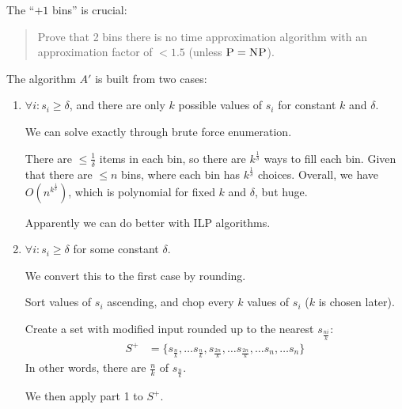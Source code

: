                 The ``$+1$ bins'' is crucial:
                \begin{quote}
                    Prove that 2 bins there is no \p time approximation algorithm with an approximation factor of $< 1.5$ (unless $\textsc{P} = \textsc{NP}$).
                \end{quote}

                The algorithm $A'$ is built from two cases:
                \begin{enumerate}
                    \item $\forall i: s_i \ge \delta$, and there are only $k$ possible values of $s_i$ for constant $k$ and $\delta$.

                        We can solve exactly through brute force enumeration.

                        There are $\le \frac{1}{\delta}$ items in each bin, so there are $k^\frac{1}{\delta}$ ways to fill each bin.
                        Given that there are $\le n$ bins, where each bin has $k^\frac{1}{\delta}$ choices.
                        Overall, we have $O(n^{k^\frac{1}{\delta}})$, which is polynomial for fixed $k$ and $\delta$, but huge.

                        Apparently we can do better with ILP algorithms.
                    \item $\forall i: s_i \ge \delta$ for some constant $\delta$.

                        We convert this to the first case by rounding.

                        Sort values of $s_i$ ascending, and chop every $k$ values of $s_i$ ($k$ is chosen later).

                        Create a set with modified input rounded up to the nearest $s_{\frac{ni}{k}}$:
                        \begin{align*}
                            S^+ &= \{ s_{\frac{n}{k}}, \ldots s_\frac{n}{k}, s_{\frac{2n}{k}}, \ldots s_\frac{2n}{k}, \ldots s_{n}, \ldots s_n \}
                        \end{align*}
                        In other words, there are $\frac{n}{k}$ of $s_{\frac{n}{k}}$.

                        We then apply part 1 to $S^+$.


\end{enumerate}
